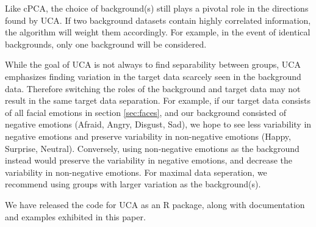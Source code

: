 \documentclass[10pt]{article}
\begin{document}
Like cPCA, the choice of background(s) still plays a pivotal role in the directions found by UCA. If two background datasets contain highly correlated information, the algorithm will weight them accordingly. For example, in the event of identical backgrounds, only one background will be considered.

While the goal of UCA is not always to find separability between groups, UCA emphasizes finding variation in the target data scarcely seen in the background data. Therefore switching the roles of the background and target data may not result in the same target data separation. For example, if our target data consists of all facial emotions in section \ref{sec:faces}, and our background consisted of negative emotions (Afraid, Angry, Disgust, Sad), we hope to see less variability in negative emotions and preserve variability in non-negative emotions (Happy, Surprise, Neutral).
Conversely, using non-negative emotions as the background instead would preserve the variability in negative emotions, and decrease the variability in non-negative emotions. For maximal data seperation, we recommend using groups with larger variation as the background(s).

We have released the code for UCA as an R package, along with documentation and examples exhibited in this paper. 
\end{document}
